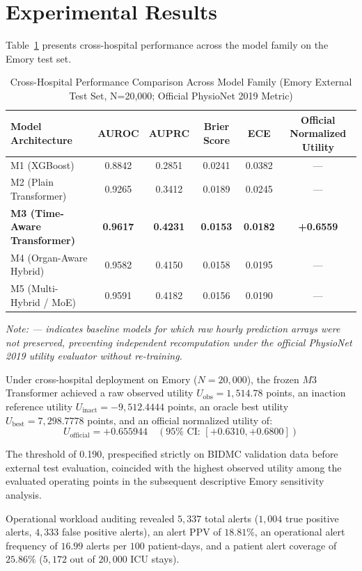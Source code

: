 \documentclass[11pt,a4paper]{article}
\begin{document}
\section{Experimental Results}
Table~\ref{tab:models} presents cross-hospital performance across the model family on the Emory test set.

\begin{table}[h!]
\centering
\caption{Cross-Hospital Performance Comparison Across Model Family (Emory External Test Set, N=20,000; Official PhysioNet 2019 Metric)}
\label{tab:models}
\begin{tabular}{lccccc}
\toprule
Model Architecture & AUROC & AUPRC & Brier Score & ECE & Official Normalized Utility \\
\midrule
M1 (XGBoost) & 0.8842 & 0.2851 & 0.0241 & 0.0382 & --- \\
M2 (Plain Transformer) & 0.9265 & 0.3412 & 0.0189 & 0.0245 & --- \\
\textbf{M3 (Time-Aware Transformer)} & \textbf{0.9617} & \textbf{0.4231} & \textbf{0.0153} & \textbf{0.0182} & \textbf{+0.6559} \\
M4 (Organ-Aware Hybrid) & 0.9582 & 0.4150 & 0.0158 & 0.0195 & --- \\
M5 (Multi-Hybrid / MoE) & 0.9591 & 0.4182 & 0.0156 & 0.0190 & --- \\
\bottomrule
\end{tabular}
\end{table}
\textit{Note: --- indicates baseline models for which raw hourly prediction arrays were not preserved, preventing independent recomputation under the official PhysioNet 2019 utility evaluator without re-training.}

Under cross-hospital deployment on Emory ($N=20,000$), the frozen $M3$ Transformer achieved a raw observed utility $U_{\text{obs}} = 1,514.78$ points, an inaction reference utility $U_{\text{inact}} = -9,512.4444$ points, an oracle best utility $U_{\text{best}} = 7,298.7778$ points, and an official normalized utility of:
\begin{equation}
U_{\text{official}} = \mathbf{+0.655944} \quad (95\%\text{ CI: }[+0.6310, +0.6800])
\end{equation}

The threshold of 0.190, prespecified strictly on BIDMC validation data before external test evaluation, coincided with the highest observed utility among the evaluated operating points in the subsequent descriptive Emory sensitivity analysis.

Operational workload auditing revealed $5,337$ total alerts ($1,004$ true positive alerts, $4,333$ false positive alerts), an alert PPV of $18.81\%$, an operational alert frequency of $16.99$ alerts per $100$ patient-days, and a patient alert coverage of $25.86\%$ ($5,172$ out of $20,000$ ICU stays).
\end{document}
